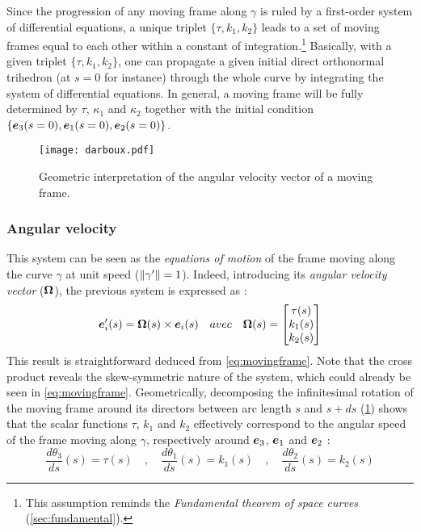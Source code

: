 Since the progression of any moving frame along $\gamma$ is ruled by a first-order system of differential equations, a unique triplet $\{\tau, k_{1}, k_{2}\}$ leads to a set of moving frames equal to each other within a constant of integration.\footnote{This assumption reminds the \emph{Fundamental theorem of space curves} (\cref{sec:fundamental}).} Basically, with a given triplet $\{\tau, k_{1}, k_{2}\}$, one can propagate a given initial direct orthonormal trihedron (at $s=0$ for instance) through the whole curve by integrating the system of differential equations. In general, a moving frame will be fully determined by $\tau$, $\kappa_{1}$ and $\kappa_{2}$ together with the initial condition $\{\boldsymbol{e}_{3}(s=0),\boldsymbol{e}_{1}(s=0),\boldsymbol{e}_{2}(s=0)\}$.

\begin{figure}[t]
\centering
\texttt{[image: darboux.pdf]}
\caption{Geometric interpretation of the angular velocity vector of a moving frame.}
\label{fig:3_4}
\end{figure}

\subsubsection{Angular velocity}
This system can be seen as the \emph{equations of motion} of the frame moving along the curve $\gamma$ at unit speed ($\lVert\gamma'\rVert=1$). Indeed, introducing its \emph{angular velocity vector} ($\boldsymbol{\Omega}$), the previous system is expressed as :
\begin{equation}
	\boldsymbol{e}'_{i}(s) = \boldsymbol{\Omega}(s) \times \boldsymbol{e}_{i}(s)
	\quad avec \quad
	\boldsymbol{\Omega}(s)
	=
	\begin{bmatrix}
		\tau(s) \\
		k_1(s) \\
		k_2(s)
	\end{bmatrix}
\end{equation}
This result is straightforward deduced from \cref{eq:movingframe}. Note that the cross product reveals the skew-symmetric nature of the system, which could already be seen in \cref{eq:movingframe}.
Geometrically, decomposing the infinitesimal rotation of the moving frame around its directors between arc length $s$ and $s+ds$ (\cref{fig:3_4}) shows that the scalar functions $\tau$, $k_{1}$ and $k_{2}$ effectively correspond to the angular speed of the frame moving along $\gamma$, respectively around $\boldsymbol{e}_{3}$, $\boldsymbol{e}_{1}$ and $\boldsymbol{e}_{2}$ :
\begin{equation}
	\frac{d\theta_3}{ds}(s) = \tau(s)
	\quad,\quad
	\frac{d\theta_1}{ds}(s) = k_{1}(s)
	\quad,\quad
	\frac{d\theta_2}{ds}(s) = k_{2}(s)
\end{equation}

